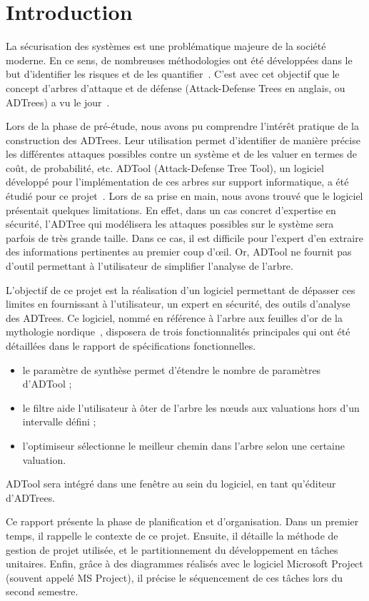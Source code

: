 \section{Introduction}
    \label{sec:intro}

    La sécurisation des systèmes est une problématique majeure de la société moderne. En ce sens, de nombreuses méthodologies ont été développées dans le but d'identifier les risques et de les quantifier~\cite{survey}. C'est avec cet objectif que le concept d'arbres d'attaque et de défense (\og Attack-Defense Trees \fg{} en anglais, ou ADTrees) a vu le jour~\cite{JLC}.

    Lors de la phase de pré-étude, nous avons pu comprendre l’intérêt pratique de la construction des ADTrees. Leur utilisation permet d'identifier de manière précise les différentes attaques possibles contre un système et de les valuer en termes de coût, de probabilité, etc. ADTool (Attack-Defense Tree Tool), un logiciel développé pour l'implémentation de ces arbres sur support informatique, a été étudié pour ce projet~\cite{ADTool}. Lors de sa prise en main, nous avons trouvé que le logiciel présentait quelques limitations. En effet, dans un cas concret d'expertise en sécurité, l'ADTree qui modélisera les attaques possibles sur le système sera parfois de très grande taille. Dans ce cas, il est difficile pour l'expert d'en extraire des informations pertinentes au premier coup d’œil. Or, ADTool ne fournit pas d'outil permettant à l'utilisateur de simplifier l'analyse de l'arbre. 

    L'objectif de ce projet est la réalisation d'un logiciel permettant de dépasser ces limites en fournissant à l'utilisateur, un expert en sécurité, des outils d'analyse des ADTrees. Ce logiciel, nommé \glasir{} en référence à l'arbre aux feuilles d'or de la mythologie nordique~\cite{vikingCulture}, disposera de trois fonctionnalités principales qui ont été détaillées dans le rapport de spécifications fonctionnelles. 
    \begin{itemize}
    	\item le paramètre de synthèse permet d'étendre le nombre de paramètres d'ADTool ;
    	\item le filtre aide l'utilisateur à ôter de l’arbre les nœuds aux valuations hors d'un intervalle défini ;
    	\item l'optimiseur sélectionne le meilleur chemin dans l'arbre selon une certaine valuation.
    \end{itemize}
    ADTool sera intégré dans une fenêtre au sein du logiciel, en tant qu'éditeur d'ADTrees. 

    Ce rapport présente la phase de planification et d'organisation. Dans un premier temps, il rappelle le contexte de ce projet. Ensuite, il détaille la méthode de gestion de projet utilisée, et le partitionnement du développement en tâches unitaires. Enfin, grâce à des diagrammes réalisés avec le logiciel Microsoft Project (souvent appelé MS Project), il précise le séquencement de ces tâches lors du second semestre.